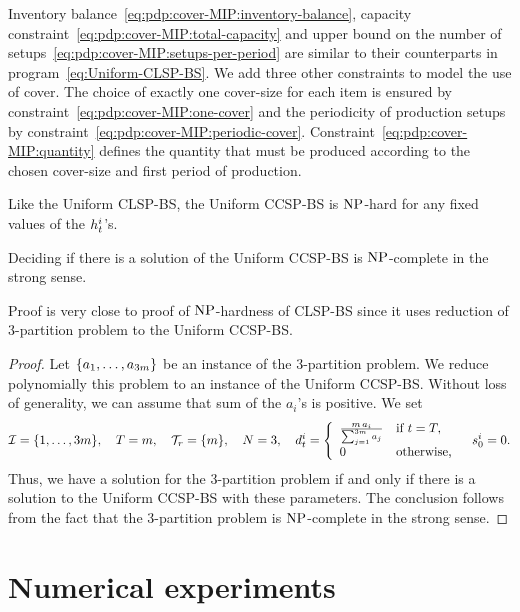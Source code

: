 Inventory balance~\eqref{eq:pdp:cover-MIP:inventory-balance}, capacity constraint~\eqref{eq:pdp:cover-MIP:total-capacity} and upper bound on the number of setups~\eqref{eq:pdp:cover-MIP:setups-per-period} are similar to their counterparts in program~\eqref{eq:Uniform-CLSP-BS}.
We add three other constraints to model the use of cover.
The choice of exactly one cover-size for each item is ensured by constraint~\eqref{eq:pdp:cover-MIP:one-cover} and the periodicity of production setups by constraint~\eqref{eq:pdp:cover-MIP:periodic-cover}.
Constraint~\eqref{eq:pdp:cover-MIP:quantity} defines the quantity that must be produced according to the chosen cover-size and first period of production.


\medskip


Like the Uniform CLSP-BS, the Uniform CCSP-BS is $\operatorname{NP}$-hard for any fixed values of the $h_t^i$'s.

\begin{thm}
  Deciding if there is a solution of the Uniform CCSP-BS is $\operatorname{NP}$-complete in the strong sense.
\end{thm}


Proof is very close to proof of $\operatorname{NP}$-hardness of CLSP-BS since it uses reduction of 3-partition problem to the Uniform CCSP-BS.


\begin{proof}
Let $\crbracket{a_1,\ldots,a_{3m}}$ be an instance of the 3-partition problem.
We reduce polynomially this problem to an instance of the Uniform CCSP-BS.
Without loss of generality, we can assume that sum of the $a_i$'s is positive.
We set
\begin{equation}
  \REF=\range[1]{3m}
  ,\quad
  \horizon=m
  ,\quad
  \coverset_r=\crbracket{m}
  ,\quad
  \nbsetups=3
  ,\quad
  \demand_t^i
  =\left\{
  \begin{array}{ll}
  \frac{m\,a_i}{\sum_{j=1}^{3m}a_j} & \mbox{if}\ t=\horizon,
  \\
  0 & \mbox{otherwise,}\end{array}
  \right.
  \quad
  \inventory_0^i=0.
\end{equation}
Thus, we have a solution for the 3-partition problem if and only if there is a solution to the Uniform CCSP-BS with these parameters. The conclusion follows from the fact that the 3-partition problem is $\operatorname{NP}$-complete in the strong sense.
\end{proof}


\section{Numerical experiments}
\label{sec:pdp-cover:numerical-experiments}


